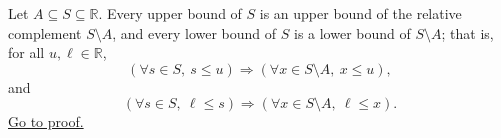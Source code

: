 \begin{corollary}
\label{cor:complements-inherit-ambient-bounds}
Let $A\subseteq S\subseteq\mathbb{R}$. Every upper bound of $S$ is an
upper bound of the relative complement $S\setminus A$, and every lower
bound of $S$ is a lower bound of $S\setminus A$; that is, for all
$u,\ell\in\mathbb{R}$,
\[
\left(\forall s\in S,\ s\leq u\right)
\Longrightarrow
(\forall x\in S\setminus A,\ x\leq u),
\]
and
\[
\left(\forall s\in S,\ \ell\leq s\right)
\Longrightarrow
(\forall x\in S\setminus A,\ \ell\leq x).
\]
\hyperref[prf:complements-inherit-ambient-bounds]{Go to proof.}
\end{corollary}